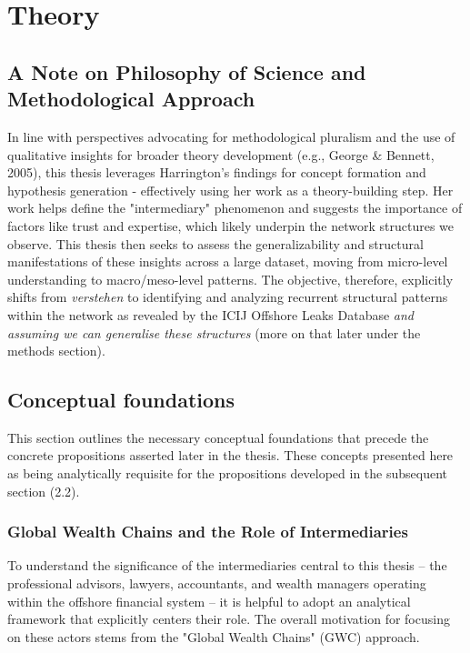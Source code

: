 \chapter{Theory}
\label{chap:theory}

\section{A Note on Philosophy of Science and Methodological Approach}
\label{sec:2_0}

In line with perspectives advocating for methodological pluralism and the use of qualitative insights for broader theory development (e.g., George \& Bennett, 2005), this thesis leverages Harrington's findings for concept formation and hypothesis generation - effectively using her work as a theory-building step. Her work helps define the "intermediary" phenomenon and suggests the importance of factors like trust and expertise, which likely underpin the network structures we observe. This thesis then seeks to assess the generalizability and structural manifestations of these insights across a large dataset, moving from micro-level understanding to macro/meso-level patterns. The objective, therefore, explicitly shifts from \textit{verstehen} to identifying and analyzing recurrent structural patterns within the network as revealed by the ICIJ Offshore Leaks Database \textit{and assuming we can generalise these structures} (more on that later under the methods section).

\section{Conceptual foundations}
\label{sec:2_1}

This section outlines the necessary conceptual foundations that precede the concrete propositions asserted later in the thesis. These concepts presented here as being analytically requisite for the propositions developed in the subsequent section (2.2).

\subsection{Global Wealth Chains and the Role of Intermediaries}
\label{subsec:2_1_1}

To understand the significance of the intermediaries central to this thesis – the professional advisors, lawyers, accountants, and wealth managers operating within the offshore financial system – it is helpful to adopt an analytical framework that explicitly centers their role. The overall motivation for focusing on these actors stems from the "Global Wealth Chains" (GWC) approach.

